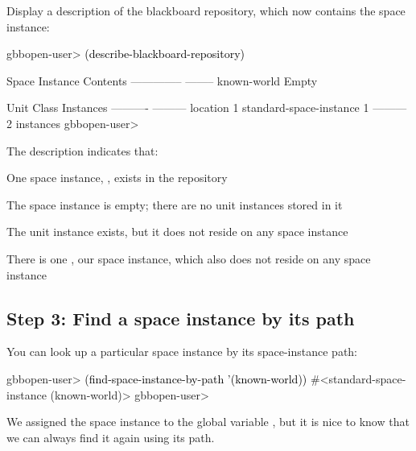 \documentclass[10pt,twoside,english,pdftex]{article}
\begin{document}
%
%
Display a description of the blackboard repository, which now contains the
 space instance:
%
\W\supp
\begin{example}
\textcolor{darkergray}{%
  gbbopen-user> \textcolor{black}{(describe-blackboard-repository)}
  
  Space Instance                Contents
  --------------                --------
  known-world                   Empty

  Unit Class                    Instances
  ----------                    ---------
  location                              1
  standard-space-instance               1
                                ---------
                                        2 instances
  gbbopen-user>}
\end{example}

The description indicates that:
\begin{tightitemize}
\item One space instance, , exists in the repository
\item The  space instance is empty; there are no unit
  instances stored in it
\item The  unit instance exists, but it does not reside
  on any space instance
\item There is one , our
   space instance, which also does not reside
  on any space instance
\end{tightitemize}
 
\subsection*{Step 3: Find a space instance by its path}

%
%
You can look up a particular space instance by its space-instance path:
%
\W\supp
\begin{example}
\textcolor{darkergray}{%
  gbbopen-user> \textcolor{black}{(find-space-instance-by-path '(known-world))}
  #<standard-space-instance (known-world)>
  gbbopen-user>}
\end{example}

We assigned the  space instance to the global variable
, but it is nice to know that we can always find it again using its
path.
\end{document}

